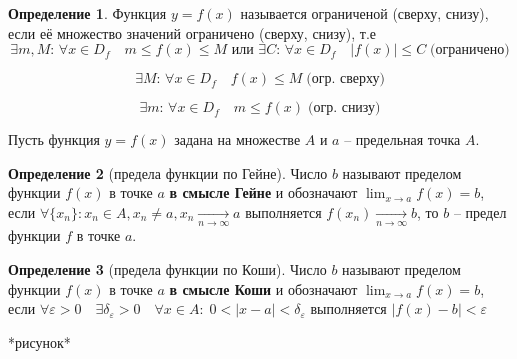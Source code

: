 \documentclass[a4paper,oneside]{article}
\newcommand{\dslim}{\displaystyle\lim}
\newcommand{\approach}[1]{\underset{#1}{\longrightarrow}}
\theoremstyle{definition}
\newtheorem{definition}{Определение}[subsection]
\theoremstyle{definition}
\theoremstyle{definition}
\begin{document}
\begin{definition}
    Функция $y = f(x)$ называется ограниченой (сверху, снизу), если её множество
    значений ограничено (сверху, снизу), т.е 
    \[
        \exists m, M: \, \forall x \in D_f \quad m \le f(x) \le M
        \text{ или }
        \exists C: \, \forall x \in D_f \quad  | f(x) | \le C
        \; \text{(ограничено)}
    \]

    \[\exists M: \, \forall x \in D_f \quad f(x) \le M \; \text{(огр. сверху)}\]

    \[\exists m: \, \forall x \in D_f \quad m \le f(x) \; \text{(огр. снизу)}\]
\end{definition}

Пусть функция $y = f(x)$ задана на множестве $A$ и $a$ -- предельная точка $A$.

\begin{definition}[предела функции по Гейне]
    Число $b$ называют пределом функции $f(x)$ в точке $a$ \textbf{в смысле Гейне}
    и обозначают $\dslim_{x \to a} f(x) = b$, если
    $\forall \{ x_n \}: x_n \in A, x_n \ne a, x_n \approach{n \to \infty} a$ выполняется
    $f(x_n) \approach{n \to \infty} b$, то $b$ -- предел функции $f$ в точке $a$.
\end{definition}

\begin{definition}[предела функции по Коши]
    Число $b$ называют пределом функции $f(x)$ в точке $a$ \textbf{в смысле Коши}
    и обозначают $\dslim_{x \to a} f(x) = b$, если
    $\forall \varepsilon > 0 \quad \exists \delta_\varepsilon > 0 \quad
    \forall x \in A : \; 0 < | x - a | < \delta_\varepsilon$ выполняется
    $|f(x) - b| < \varepsilon$

    *рисунок*
\end{definition}
\end{document}
